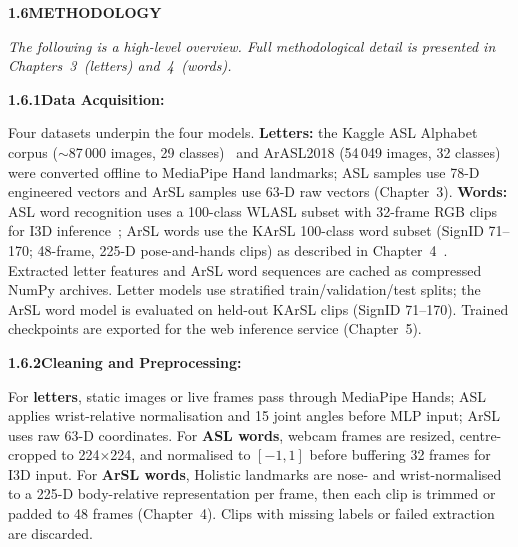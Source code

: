 \begin{secopen}
\noindent\textbf{1.6\quad METHODOLOGY}\par
{}
\vspace{0.4cm}

\noindent\textit{The following is a high-level overview. Full methodological detail is presented in Chapters~3~(letters) and~4~(words).}\par\vspace{0.4cm}
\clearpage
\noindent\textbf{1.6.1\quad Data Acquisition:}\par
{}
\vspace{0.3cm}

\noindent Four datasets underpin the four models. \textbf{Letters:} the Kaggle ASL Alphabet corpus ($\sim$87\,000 images, 29 classes)~\cite{akash2019aslalphabet} and ArASL2018 (54\,049 images, 32 classes)~\cite{arthur2018arasl2018} were converted offline to MediaPipe Hand landmarks; ASL samples use 78-D engineered vectors and ArSL samples use 63-D raw vectors (Chapter~3). \textbf{Words:} ASL word recognition uses a 100-class WLASL subset with 32-frame RGB clips for I3D inference~\cite{li2020wlasl}; ArSL words use the KArSL 100-class word subset (SignID 71--170; 48-frame, 225-D pose-and-hands clips) as described in Chapter~4~\cite{sidig2021karsl}. Extracted letter features and ArSL word sequences are cached as compressed NumPy archives. Letter models use stratified train/validation/test splits; the ArSL word model is evaluated on held-out KArSL clips (SignID 71--170). Trained checkpoints are exported for the web inference service (Chapter~5).\par
\end{secopen}
\vspace{0.4cm}

\noindent\textbf{1.6.2\quad Cleaning and Preprocessing:}\par
{}
\vspace{0.3cm}

\noindent For \textbf{letters}, static images or live frames pass through MediaPipe Hands; ASL applies wrist-relative normalisation and 15 joint angles before MLP input; ArSL uses raw 63-D coordinates. For \textbf{ASL words}, webcam frames are resized, centre-cropped to 224$\times$224, and normalised to $[-1, 1]$ before buffering 32 frames for I3D input. For \textbf{ArSL words}, Holistic landmarks are nose- and wrist-normalised to a 225-D body-relative representation per frame, then each clip is trimmed or padded to 48 frames (Chapter~4). Clips with missing labels or failed extraction are discarded.\par\vspace{0.4cm}


